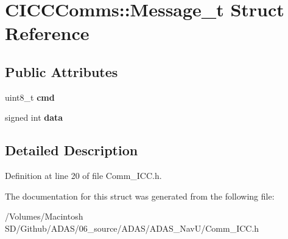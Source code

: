 \hypertarget{struct_c_i_c_c_comms_1_1_message__t}{}\section{C\+I\+C\+C\+Comms\+::Message\+\_\+t Struct Reference}
\label{struct_c_i_c_c_comms_1_1_message__t}
\subsection*{Public Attributes}
\begin{DoxyCompactItemize}
\item 
\mbox{\label{struct_c_i_c_c_comms_1_1_message__t_adf3e3290f54ee3997bc837463a340d05}} 
uint8\+\_\+t {\bfseries cmd}
\item 
\mbox{\label{struct_c_i_c_c_comms_1_1_message__t_a25cfce11e78d103524b695b281629d75}} 
signed int {\bfseries data}
\end{DoxyCompactItemize}


\subsection{Detailed Description}


Definition at line 20 of file Comm\+\_\+\+I\+C\+C.\+h.



The documentation for this struct was generated from the following file\+:\begin{DoxyCompactItemize}
\item 
/\+Volumes/\+Macintosh S\+D/\+Github/\+A\+D\+A\+S/06\+\_\+source/\+A\+D\+A\+S/\+A\+D\+A\+S\+\_\+\+Nav\+U/Comm\+\_\+\+I\+C\+C.\+h\end{DoxyCompactItemize}
